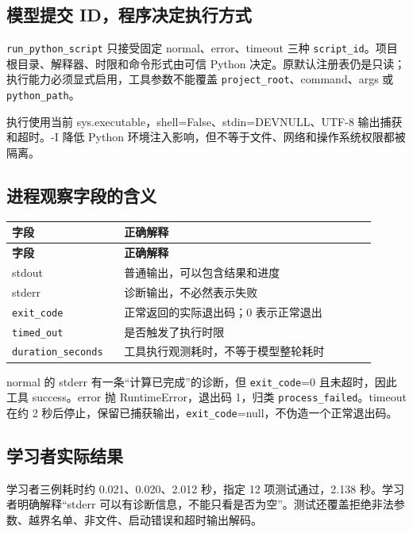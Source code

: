 \documentclass[UTF8,zihao=-4,fontset=fandol]{ctexart}
\begin{document}
\subsection{模型提交 ID，程序决定执行方式}

\nolinkurl{run_python_script} 只接受固定 normal、error、timeout 三种 \nolinkurl{script_id}。项目根目录、解释器、时限和命令形式由可信 Python 决定。原默认注册表仍是只读；执行能力必须显式启用，工具参数不能覆盖 \nolinkurl{project_root}、command、args 或 \nolinkurl{python_path}。

执行使用当前 sys.executable，shell=False、stdin=DEVNULL、UTF-8 输出捕获和超时。-I 降低 Python 环境注入影响，但不等于文件、网络和操作系统权限都被隔离。

\subsection{进程观察字段的含义}

{\small\setlength{\tabcolsep}{4pt}
\renewcommand{\arraystretch}{1.25}
\begin{longtable}{>{\raggedright\arraybackslash}p{0.28\linewidth}>{\raggedright\arraybackslash}p{0.63\linewidth}}
\toprule
\textbf{字段} & \textbf{正确解释} \\
\midrule\endfirsthead
\toprule
\textbf{字段} & \textbf{正确解释} \\
\midrule\endhead
\bottomrule\endfoot
stdout & 普通输出，可以包含结果和进度 \\
stderr & 诊断输出，不必然表示失败 \\
\nolinkurl{exit_code} & 正常返回的实际退出码；0 表示正常退出 \\
\nolinkurl{timed_out} & 是否触发了执行时限 \\
\nolinkurl{duration_seconds} & 工具执行观测耗时，不等于模型整轮耗时 \\
\end{longtable}}

normal 的 stderr 有一条“计算已完成”的诊断，但 \nolinkurl{exit_code}=0 且未超时，因此工具 success。error 抛 RuntimeError，退出码 1，归类 \nolinkurl{process_failed}。timeout 在约 2 秒后停止，保留已捕获输出，\nolinkurl{exit_code}=null，不伪造一个正常退出码。

\subsection{学习者实际结果}

学习者三例耗时约 0.021、0.020、2.012 秒，指定 12 项测试通过，2.138 秒。学习者明确解释“stderr 可以有诊断信息，不能只看是否为空”。测试还覆盖拒绝非法参数、越界名单、非文件、启动错误和超时输出解码。
\end{document}
